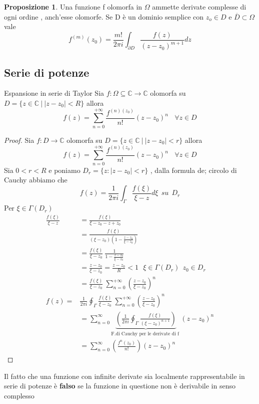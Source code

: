 \documentclass{article}
\theoremstyle{definition}
\newtheorem*{proposizione}{Proposizione}
\newcommand{\C}{\mathbb{C}}
\newcommand{\norm}[1]{|#1|}
\begin{document}
	\begin{proposizione}
		Una funzione f  olomorfa in $\Omega$ ammette derivate complesse di ogni ordine , anch'esse olomorfe. Se D è un dominio semplice con $z_o \in D$ e $\overline{D}\subset \Omega$ vale 
		$$f^{(m)}(z_0)=\frac{m!}{2 \pi i } \int_{\partial D}\frac{f(z)}{(z-z_0)^{m+1}}dz$$
 	\end{proposizione} 
 	\subsection{Serie di potenze}
	\begin{teo}{Espansione in serie di Taylor}{}
		Sia $f:\Omega \subseteq \C \rightarrow \C $ olomorfa su $D=\{z \in \C \ |\  \norm{z-z_0}<R\} $ allora 
		$$f(z)=\sum_{n=0}^{+\infty}\frac{f^{(n)(z_0)}}{n!}(z-z_0)^n \ \ \ \ \forall z \in D$$
	\end{teo}
	\begin{proof}
		Sia $f:D\rightarrow \C $ olomorfa su $D=\{z \in \C \ |\  \norm{z-z_0}<r\} $  allora 
	$$f(z)=\sum_{n=0}^{+\infty}\frac{f^{(n)(z_0)}}{n!}(z-z_0)^n \ \ \ \ \forall z \in D$$
	Sia $0<r<R$ e poniamo $D_r=\{z:\norm{z-z_0}<r\}$ , dalla formula de; circolo di Cauchy abbiamo che 
$$f(z)=\frac{1}{2 \pi i } \int_{\Gamma} \frac{f(\xi)}{\xi-z}d\xi \ \ su \ \ D_r$$
Per $\xi \in \Gamma(D_r)$ 
\begin{align*}
	\frac{f(\xi)}{\xi-z}&=\frac{f(\xi)}{\xi-z_0-z+z_0}\\
	&=\frac{f(\xi)}{(\xi -z_0)\left(1-\frac{z-z_0}{\xi-z_0}\right)}\\
	&=\frac{f(\xi)}{\xi-z_0} \ \frac{1}{1-\frac{z-z_0}{\xi-z_0}} \\
	&= \frac{z-z_0}{\xi-z_0} =\frac{z-z_0}{R}< 1 \ \ \ \xi \in \Gamma(D_r) \ \ z_0 \in D_r\\
	&=\frac{f(\xi)}{\xi-z_0}  \ \sum_{n=0}^{+\infty}\left(\frac{z-z_0}{\xi-z_0} \right)^n \\
	f(z)=&\frac{1}{2 \pi i}\oint_{\Gamma}\frac{f(\xi)}{\xi-z_0}  \ \sum_{n=0}^{+\infty}\left(\frac{z-z_0}{\xi-z_0} \right)^n \\
	&=\sum_{n=0}^{\infty}\underbrace{\left(\frac{1}{2\pi i}\oint_{\Gamma}\frac{f(\xi)}{(\xi-z_0)^{n+1}}  \right)}_{\text{F.di Cauchy per le derivate di f }}(z-z_0)^n\\
	&=\sum_{n=0}^{\infty}\left(\frac{f^{n}(z_0)}{n!}\right)(z-z_0)^n
\end{align*}
	\end{proof}
	Il fatto che una funzione con infinite derivate sia localmente rappresentabile in serie di potenze è \textbf{falso} se la funzione in questione non è derivabile in senso complesso \\
\end{document}
